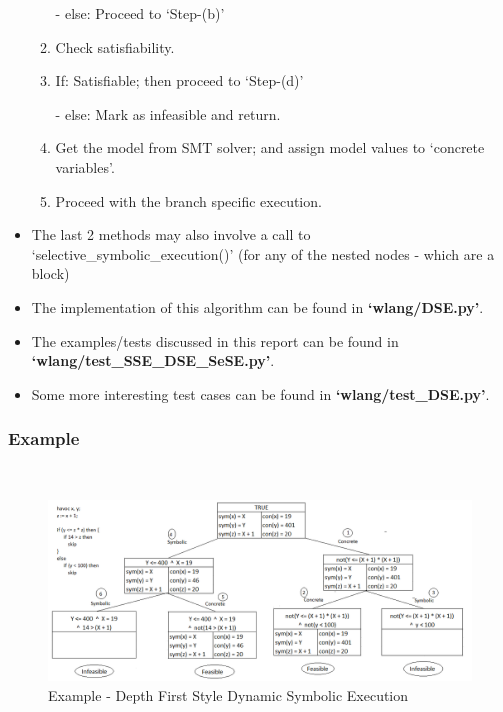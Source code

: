 \documentclass[11pt]{llncs}
\begin{document}
\begin{enumerate}
\begin{enumerate}
						           - else: Proceed to ‘Step-(b)’

						\item Check satisfiability.

						\item If:  Satisfiable; then proceed to ‘Step-(d)’

						          - else: Mark as infeasible and  return.

						\item Get the model from SMT solver;  and  assign model values to ‘concrete variables’.
						\item Proceed with the branch specific execution.
					\end{enumerate}
					
				\vspace{0.5mm}
			\end{enumerate}


			\begin{itemize}
				\item  The last 2 methods may also involve a call to ‘selective\_symbolic\_execution()’ (for any of the nested nodes - which are a block)

				\vspace{2mm}

				\item The implementation of this algorithm can be found in \textbf{‘wlang/DSE.py’}.
				\item The examples/tests discussed in this report can be found in \textbf{‘wlang/test\_SSE\_DSE\_SeSE.py’}.
				\item Some more interesting test cases can be found in \textbf{‘wlang/test\_DSE.py’}.
			\end{itemize}

		\subsubsection{Example}
			~\vspace{-4mm}
			\begin{figure}[H]
				\includegraphics[width=1.05\textwidth] {DSE_DFS_Example.png}
				\caption{Example - Depth First Style Dynamic Symbolic Execution} \label{fig_6}
			\end{figure}
\end{document}
